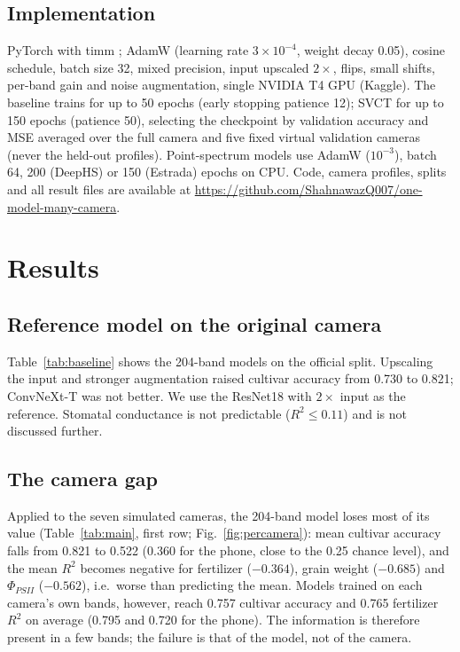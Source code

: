 \documentclass[preprint,12pt,authoryear]{elsarticle}
\begin{document}
\subsection{Implementation}
PyTorch with timm \citep{wightman2019timm}; AdamW \citep{loshchilov2019adamw} (learning rate $3\times10^{-4}$, weight
decay 0.05), cosine schedule, batch size 32, mixed precision, input upscaled $2\times$, flips, small shifts, per-band
gain and noise augmentation, single NVIDIA T4 GPU (Kaggle). The baseline trains for up to 50 epochs (early stopping
patience 12); SVCT for up to 150 epochs (patience 50), selecting the checkpoint by validation accuracy and MSE averaged
over the full camera and five fixed virtual validation cameras (never the held-out profiles). Point-spectrum models use
AdamW ($10^{-3}$), batch 64, 200 (DeepHS) or 150 (Estrada) epochs on CPU. Code, camera profiles, splits and all result
files are available at \url{https://github.com/ShahnawazQ007/one-model-many-camera}.

\section{Results}

\subsection{Reference model on the original camera}
Table~\ref{tab:baseline} shows the 204-band models on the official split. Upscaling the input and stronger augmentation
raised cultivar accuracy from 0.730 to 0.821; ConvNeXt-T \citep{liu2022convnext} was not better. We use the ResNet18
with $2\times$ input as the reference. Stomatal conductance is not predictable ($R^2\le0.11$) and is not discussed
further.

\begin{table}[t]
\centering\small
\caption{204-band models on HyperLeaf2024 (official split, test plots).}
\label{tab:baseline}

\end{table}

\subsection{The camera gap}
Applied to the seven simulated cameras, the 204-band model loses most of its value (Table~\ref{tab:main}, first row;
Fig.~\ref{fig:percamera}): mean cultivar accuracy falls from 0.821 to 0.522 (0.360 for the phone, close to the 0.25
chance level), and the mean $R^2$ becomes negative for fertilizer ($-0.364$), grain weight ($-0.685$) and $\Phi_{PSII}$
($-0.562$), i.e.\ worse than predicting the mean. Models trained on each camera's own bands, however, reach 0.757
cultivar accuracy and 0.765 fertilizer $R^2$ on average (0.795 and 0.720 for the phone). The information is therefore
present in a few bands; the failure is that of the model, not of the camera.
\end{document}
